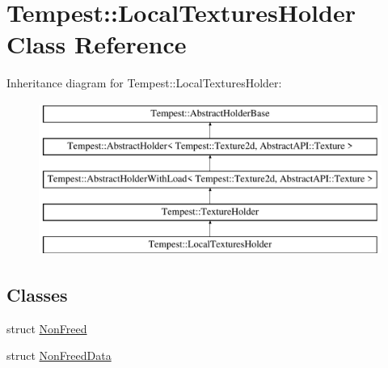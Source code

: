 \hypertarget{class_tempest_1_1_local_textures_holder}{\section{Tempest\+:\+:Local\+Textures\+Holder Class Reference}
\label{class_tempest_1_1_local_textures_holder}
}
Inheritance diagram for Tempest\+:\+:Local\+Textures\+Holder\+:\begin{figure}[H]
\begin{center}
\leavevmode
\includegraphics[height=5.000000cm]{class_tempest_1_1_local_textures_holder}
\end{center}
\end{figure}
\subsection*{Classes}
\begin{DoxyCompactItemize}
\item 
struct \hyperlink{struct_tempest_1_1_local_textures_holder_1_1_non_freed}{Non\+Freed}
\item 
struct \hyperlink{struct_tempest_1_1_local_textures_holder_1_1_non_freed_data}{Non\+Freed\+Data}
\end{DoxyCompactItemize}
